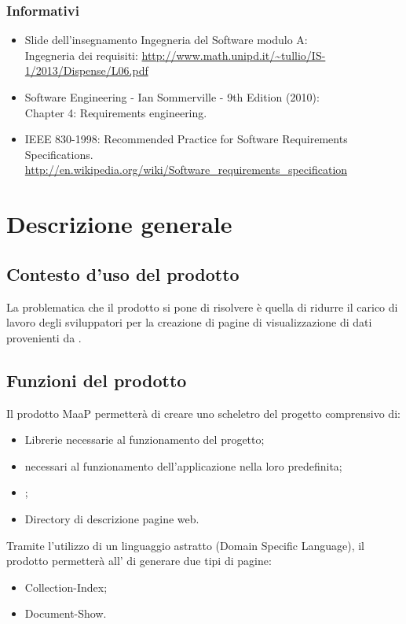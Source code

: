 \subsubsection{Informativi} %
\begin{itemize}
\item Slide dell'insegnamento Ingegneria del Software modulo A:\\
Ingegneria dei requisiti: \url{http://www.math.unipd.it/~tullio/IS-1/2013/Dispense/L06.pdf}
\item Software Engineering - Ian Sommerville - 9th Edition (2010):\\
Chapter 4: Requirements engineering.
\item IEEE 830-1998: Recommended Practice for Software Requirements Specifications.\\
\url{http://en.wikipedia.org/wiki/Software_requirements_specification}
\end{itemize}

\newpage
\section{Descrizione generale}%
\subsection{Contesto d'uso del prodotto} %
La problematica che il prodotto si pone di risolvere è quella di ridurre il carico di lavoro degli sviluppatori per la creazione di pagine  di visualizzazione di dati provenienti da .

\subsection{Funzioni del prodotto} %
Il prodotto MaaP permetterà di creare uno scheletro del progetto comprensivo di:
\begin{itemize}
\item Librerie necessarie al funzionamento del progetto;
\item {} necessari al funzionamento dell'applicazione nella loro  predefinita;
\item {};
\item Directory di descrizione pagine web.
\end{itemize}
Tramite l'utilizzo di un linguaggio astratto (Domain Specific Language), il prodotto permetterà all' di generare due tipi di pagine:
\begin{itemize}
\item Collection-Index;
\item Document-Show.
\end{itemize}

